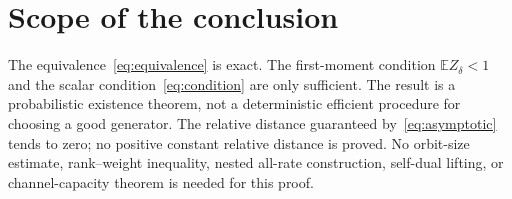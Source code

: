 \documentclass[12pt,letterpaper,onecolumn]{article}
\theoremstyle{remark}
\newcommand{\E}{\mathbb E}
\begin{document}
\section*{Scope of the conclusion}
The equivalence~\eqref{eq:equivalence} is exact. The first-moment condition $\E Z_\delta<1$ and the scalar condition~\eqref{eq:condition} are only sufficient. The result is a probabilistic existence theorem, not a deterministic efficient procedure for choosing a good generator. The relative distance guaranteed by~\eqref{eq:asymptotic} tends to zero; no positive constant relative distance is proved. No orbit-size estimate, rank--weight inequality, nested all-rate construction, self-dual lifting, or channel-capacity theorem is needed for this proof.
\end{document}
